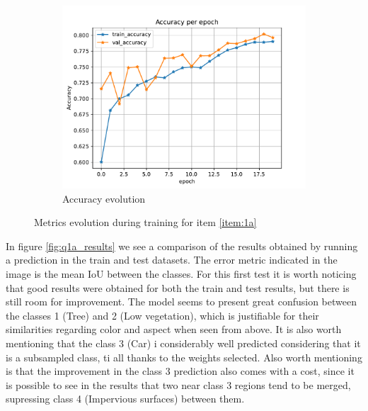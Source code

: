 \documentclass[10pt, a4paper]{article}
\begin{document}
\begin{figure}[htpb]
\begin{subfigure}[b]{0.32\textwidth}
      \centering
      \includegraphics[width=\textwidth]{images/Patch32_imagenet_acc.pdf}
      \caption{Accuracy evolution}
      \label{fig:q1a_acc}
  \end{subfigure}
  \caption{Metrics evolution during training for item \ref{item:1a}}
  \label{fig:q1a_metrics}
\end{figure}

In figure \ref{fig:q1a_results} we see a comparison of the results obtained by running a prediction in the train and test datasets. The error metric indicated
in the image is the mean IoU between the classes. For this first test it is worth noticing that good results were obtained for both the train and test results,
but there is still room for improvement. The model seems to present great confusion between the classes 1 (Tree) and 2 (Low vegetation), which is justifiable
for their similarities regarding color and aspect when seen from above. It is also worth mentioning that the class 3 (Car) i considerably well predicted considering
that it is a subsampled class, ti all thanks to the weights selected. Also worth mentioning is that the improvement in the class 3 prediction also comes with a cost,
since it is possible to see in the results that two near class 3 regions tend to be merged, supressing class 4 (Impervious surfaces) between them.
\end{document}

